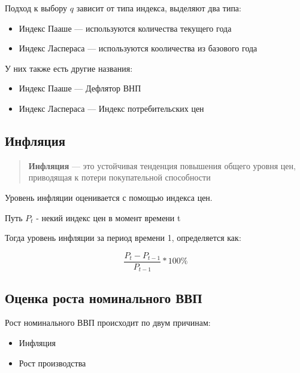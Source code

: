 \documentclass{article}
\begin{document}
    Подход к выбору $q$ зависит от типа индекса, выделяют два типа:

    \begin{itemize}
        \item Индекс Пааше --- используются количества текущего года
        \item Индекс Ласпераса --- используются кооличества из базового года 

    \end{itemize}
    
    
    У них также есть другие названия: 
    
    \begin{itemize}
        \item Индекс Пааше --- Дефлятор ВНП
        \item Индекс Ласпераса --- Индекс потребительских цен
    \end{itemize}
    
    
    \subsection{Инфляция}
    
    \begin{quote}
        \textbf{Инфляция} --- это устойчивая тенденция повышения
        общего уровня цен, приводящая к потери
        покупательной способности
    \end{quote}
    
    Уровень инфляции оценивается с помощью индекса цен.
    
    Путь $P_{t}$ - некий индекс цен в момент времени t 
    
    Тогда уровень инфляции за период времени 1, определяется как: 
    
    \begin{equation}
        \dfrac{P_{t} - P_{t-1}}{P_{t-1}} * 100\%
    \end{equation}
    
    
    \subsection{Оценка роста номинального ВВП}
    
    Рост номинального ВВП происходит по двум причинам: 
    
    \begin{itemize}
        \item Инфляция 
        \item Рост производства
    \end{itemize}
    
\end{document}
